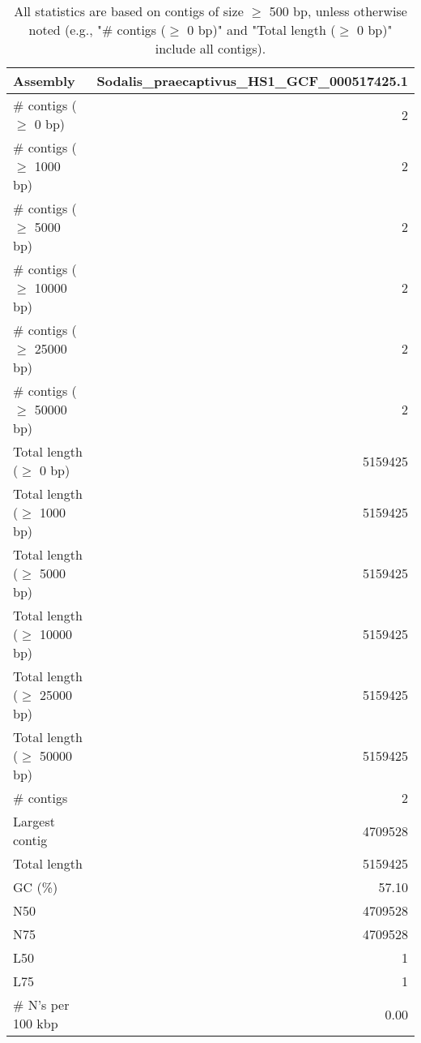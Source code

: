 \documentclass[12pt,a4paper]{article}
\begin{document}
\begin{table}[ht]
\begin{center}
\caption{All statistics are based on contigs of size $\geq$ 500 bp, unless otherwise noted (e.g., "\# contigs ($\geq$ 0 bp)" and "Total length ($\geq$ 0 bp)" include all contigs).}
\begin{tabular}{|l*{1}{|r}|}
\hline
Assembly & Sodalis\_praecaptivus\_HS1\_GCF\_000517425.1 \\ \hline
\# contigs ($\geq$ 0 bp) & 2 \\ \hline
\# contigs ($\geq$ 1000 bp) & 2 \\ \hline
\# contigs ($\geq$ 5000 bp) & 2 \\ \hline
\# contigs ($\geq$ 10000 bp) & 2 \\ \hline
\# contigs ($\geq$ 25000 bp) & 2 \\ \hline
\# contigs ($\geq$ 50000 bp) & 2 \\ \hline
Total length ($\geq$ 0 bp) & 5159425 \\ \hline
Total length ($\geq$ 1000 bp) & 5159425 \\ \hline
Total length ($\geq$ 5000 bp) & 5159425 \\ \hline
Total length ($\geq$ 10000 bp) & 5159425 \\ \hline
Total length ($\geq$ 25000 bp) & 5159425 \\ \hline
Total length ($\geq$ 50000 bp) & 5159425 \\ \hline
\# contigs & 2 \\ \hline
Largest contig & 4709528 \\ \hline
Total length & 5159425 \\ \hline
GC (\%) & 57.10 \\ \hline
N50 & 4709528 \\ \hline
N75 & 4709528 \\ \hline
L50 & 1 \\ \hline
L75 & 1 \\ \hline
\# N's per 100 kbp & 0.00 \\ \hline
\end{tabular}
\end{center}
\end{table}
\end{document}
